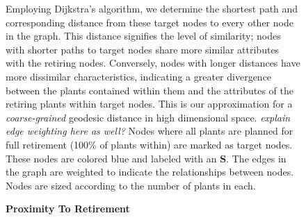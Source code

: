 \begin{figure}[H]
    \centering
    \begin{minipage}{0.5\textwidth}
          
    \end{minipage}%
    \begin{minipage}{0.5\textwidth}
          
    \end{minipage}

    \caption{\textbf{Proximity To Retirement}}
    \medskip
    \footnotesize
    Employing Dijkstra's algorithm, we determine the shortest path and corresponding distance from these target nodes to every other node in the graph. This distance signifies the level of similarity; nodes with shorter paths to target nodes share more similar attributes with the retiring nodes. Conversely, nodes with longer distances have more dissimilar characteristics, indicating a greater divergence between the plants contained within them and the attributes of the retiring plants within target nodes.  This is our approximation for a \textit{coarse-grained} geodesic distance in high dimensional space. \textit{explain edge weighting here as well?}
    Nodes where all plants are planned for full retirement (100\% of plants within) are marked as target nodes. These nodes are colored blue and labeled with an \textbf{S}. The edges in the graph are weighted to indicate the relationships between nodes. Nodes are sized according to the number of plants in each. 
    \label{fig:shortest-path-graphs}
\end{figure}